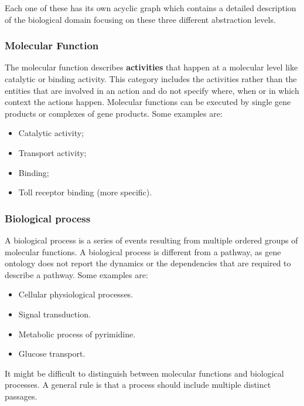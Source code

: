 Each one of these has its own acyclic graph which contains a detailed description of the biological domain focusing on these three different abstraction levels. 

		\subsubsection{Molecular Function}
		The molecular function describes \textbf{activities} that happen at a molecular level like catalytic or binding activity.
		This category includes the activities rather than the entities that are involved in an action and do not specify where, when or in which context the actions happen.
		Molecular functions can be executed by single gene products or complexes of gene products.
		Some examples are:

		\begin{multicols}{4}
			\begin{itemize}
				\item Catalytic activity;
				\item Transport activity;
				\item Binding;
				\item Toll receptor binding (more specific).
			\end{itemize}
		\end{multicols}

		\subsubsection{Biological process}
		A biological process is a series of events resulting from multiple ordered groups of molecular functions.
		A biological process is different from a pathway, as gene ontology does not report the dynamics or the dependencies that are required to describe a pathway.
		Some examples are:

		\begin{multicols}{4}
			\begin{itemize}
				\item Cellular physiological processes.
				\item Signal transduction.
				\item Metabolic process of pyrimidine.
				\item Glucose transport.
			\end{itemize}
		\end{multicols}
		It might be difficult to distinguish between molecular functions and biological processes.
		A general rule is that a process should include multiple distinct passages.

